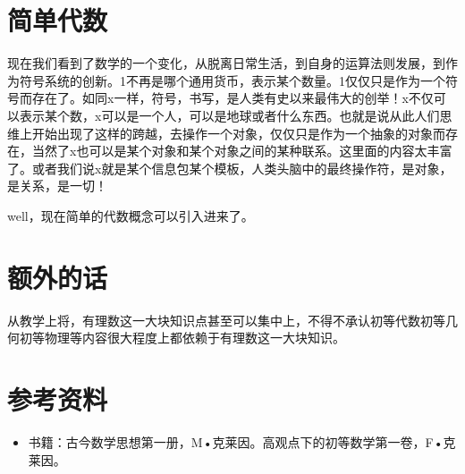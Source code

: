 \documentclass[12pt]{exam}%
\begin{document}
\section{简单代数}
现在我们看到了数学的一个变化，从脱离日常生活，到自身的运算法则发展，到作为符号系统的创新。1不再是哪个通用货币，表示某个数量。1仅仅只是作为一个符号而存在了。如同x一样，符号，书写，是人类有史以来最伟大的创举！x不仅可以表示某个数，x可以是一个人，可以是地球或者什么东西。也就是说从此人们思维上开始出现了这样的跨越，去操作一个对象，仅仅只是作为一个抽象的对象而存在，当然了x也可以是某个对象和某个对象之间的某种联系。这里面的内容太丰富了。或者我们说x就是某个信息包某个模板，人类头脑中的最终操作符，是对象，是关系，是一切！

well，现在简单的代数概念可以引入进来了。


\section{额外的话}
从教学上将，有理数这一大块知识点甚至可以集中上，不得不承认初等代数初等几何初等物理等内容很大程度上都依赖于有理数这一大块知识。

\section{参考资料}
\begin{itemize}
\item 书籍：古今数学思想第一册，M•克莱因。高观点下的初等数学第一卷，F•克莱因。
\end{itemize}
\end{document}
